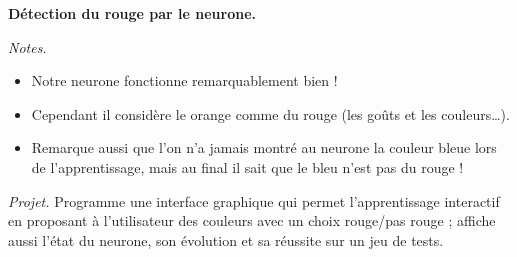 \documentclass[11pt,class=report,crop=false]{standalone}
\begin{document}
\begin{activite}[Neurone]
\begin{enumerate}
\begin{center}
\begin{tabular}{|c|c|c|c|c|}
	\end{tabular}

  {\bf Détection du rouge par le neurone.}
\end{center} 	
	
	\medskip
	
\emph{Notes.} 
\begin{itemize}
	\item Notre neurone fonctionne remarquablement bien ! 
	\item Cependant il considère le orange comme du rouge (les goûts et les couleurs\ldots).
	\item Remarque aussi que l'on n'a jamais montré au neurone la couleur bleue lors de l'apprentissage, mais au final il sait que le bleu n'est pas du rouge !
\end{itemize}	
	
\end{enumerate}


\emph{Projet.} Programme une interface graphique qui permet l'apprentissage interactif en proposant à l'utilisateur des couleurs avec un choix \og{}rouge/pas rouge\fg{} ; affiche aussi l'état du neurone, son évolution et sa réussite sur un jeu de tests.
\end{activite}
\end{document}

